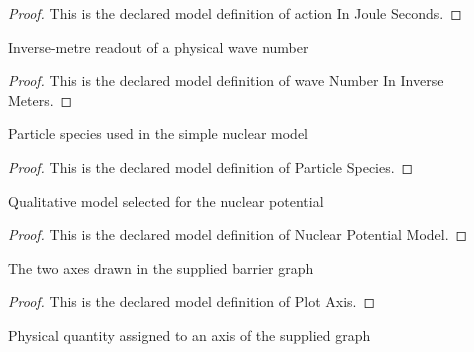\begin{proof}
  This is the declared model definition of action In Joule Seconds.
\end{proof}
\begin{definition}
  \label{def:physics:phyx-mini-0520:phyxminiproblems-problemphyxmini0520-wavenumberininversemeters}
  Inverse-metre readout of a physical wave number
\end{definition}
\begin{proof}
  This is the declared model definition of wave Number In Inverse Meters.
\end{proof}
\begin{definition}
  \label{def:physics:phyx-mini-0520:phyxminiproblems-problemphyxmini0520-particlespecies}
  Particle species used in the simple nuclear model
\end{definition}
\begin{proof}
  This is the declared model definition of Particle Species.
\end{proof}
\begin{definition}
  \label{def:physics:phyx-mini-0520:phyxminiproblems-problemphyxmini0520-nuclearpotentialmodel}
  Qualitative model selected for the nuclear potential
\end{definition}
\begin{proof}
  This is the declared model definition of Nuclear Potential Model.
\end{proof}
\begin{definition}
  \label{def:physics:phyx-mini-0520:phyxminiproblems-problemphyxmini0520-plotaxis}
  The two axes drawn in the supplied barrier graph
\end{definition}
\begin{proof}
  This is the declared model definition of Plot Axis.
\end{proof}
\begin{definition}
  \label{def:physics:phyx-mini-0520:phyxminiproblems-problemphyxmini0520-plotaxisquantity}
  Physical quantity assigned to an axis of the supplied graph
\end{definition}
